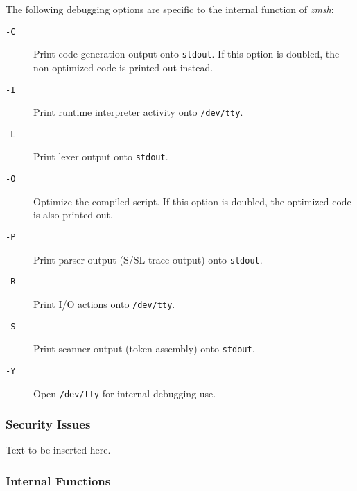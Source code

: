 The following debugging options are specific to the internal 
function of {\em zmsh\/}: 
\begin{description}
\item[{\tt -C}] \mbox{}

Print code generation output onto 
{\tt stdout}. If this option is doubled, the non-optimized 
code is printed out instead. 

\item[{\tt -I}] \mbox{}

Print runtime interpreter activity onto 
{\tt /dev/tty}. 

\item[{\tt -L}] \mbox{}

Print lexer output onto {\tt stdout}. 

\item[{\tt -O}] \mbox{}

Optimize the compiled script. If this 
option is doubled, the optimized code is also printed out. 

\item[{\tt -P}] \mbox{}

Print parser output (S/SL trace output) 
onto {\tt stdout}. 

\item[{\tt -R}] \mbox{}

Print I/O actions onto {\tt /dev/tty}. 

\item[{\tt -S}] \mbox{}

Print scanner output (token assembly) 
onto {\tt stdout}. 

\item[{\tt -Y}] \mbox{}

Open {\tt /dev/tty} for internal 
debugging use. 

\end{description}





\subsubsection{Security Issues}

Text to be inserted here.




\subsubsection{Internal Functions}

